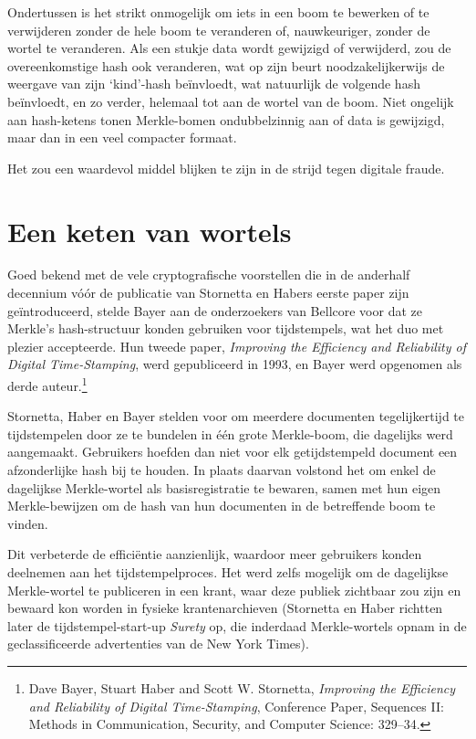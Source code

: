 \documentclass[
  a5paper,
  smalldemyvopaper,11pt,twoside,onecolumn,openright,extrafontsizes,
hidelinks]{memoir}
\begin{document}
Ondertussen is het strikt onmogelijk om iets in een boom te bewerken of
te verwijderen zonder de hele boom te veranderen of, nauwkeuriger,
zonder de wortel te veranderen. Als een stukje data wordt gewijzigd of
verwijderd, zou de overeenkomstige hash ook veranderen, wat op zijn
beurt noodzakelijkerwijs de weergave van zijn `kind'-hash beïnvloedt,
wat natuurlijk de volgende hash beïnvloedt, en zo verder, helemaal tot
aan de wortel van de boom. Niet ongelijk aan hash-ketens tonen
Merkle-bomen ondubbelzinnig aan of data is gewijzigd, maar dan in een
veel compacter formaat.

Het zou een waardevol middel blijken te zijn in de strijd tegen digitale
fraude.

\section{Een keten van wortels}\label{een-keten-van-wortels}

Goed bekend met de vele cryptografische voorstellen die in de anderhalf
decennium vóór de publicatie van Stornetta en Habers eerste paper zijn
geïntroduceerd, stelde Bayer aan de onderzoekers van Bellcore voor dat
ze Merkle's hash-structuur konden gebruiken voor tijdstempels, wat het
duo met plezier accepteerde. Hun tweede paper, \emph{Improving the
Efficiency and Reliability of Digital Time-Stamping}, werd gepubliceerd
in 1993, en Bayer werd opgenomen als derde auteur.\footnote{Dave Bayer,
  Stuart Haber and Scott W. Stornetta, \emph{Improving the Efficiency
  and Reliability of Digital Time-Stamping}, Conference Paper, Sequences
  II: Methods in Communication, Security, and Computer Science: 329--34.}

Stornetta, Haber en Bayer stelden voor om meerdere documenten
tegelijkertijd te tijdstempelen door ze te bundelen in één grote
Merkle-boom, die dagelijks werd aangemaakt. Gebruikers hoefden dan niet
voor elk getijdstempeld document een afzonderlijke hash bij te houden.
In plaats daarvan volstond het om enkel de dagelijkse Merkle-wortel als
basisregistratie te bewaren, samen met hun eigen Merkle-bewijzen om de
hash van hun documenten in de betreffende boom te vinden.

Dit verbeterde de efficiëntie aanzienlijk, waardoor meer gebruikers
konden deelnemen aan het tijdstempelproces. Het werd zelfs mogelijk om
de dagelijkse Merkle-wortel te publiceren in een krant, waar deze
publiek zichtbaar zou zijn en bewaard kon worden in fysieke
krantenarchieven (Stornetta en Haber richtten later de
tijdstempel-start-up \emph{Surety} op, die inderdaad Merkle-wortels
opnam in de geclassificeerde advertenties van de New York Times).
\end{document}
